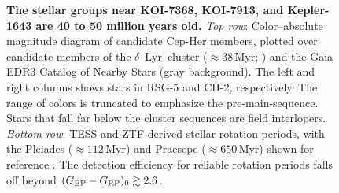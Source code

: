 \documentclass[12pt,twocolumn]{aastex63}
\newcommand{\bpmrpo}{(G_{\rm BP}-G_{\rm RP})_0}
\begin{document}
\begin{figure}[tp]
\begin{center}
		\vspace{-0.6cm}
	\end{center}
	\vspace{-0.7cm}
	\caption{
		{\bf The stellar groups near KOI-7368, KOI-7913, and Kepler-1643
    are 40 to 50 million years old.} 
    {\it Top row}: Color--absolute magnitude diagram of candidate
    Cep-Her members, plotted over candidate members of the
    $\delta$~Lyr~cluster ($\approx38$\,Myr;
    \citealt{bouma_kep1627_2022}) and the Gaia EDR3 Catalog of Nearby
    Stars (gray background).  The left and right columns shows stars
    in RSG-5 and CH-2, respectively.  The range of colors is truncated
    to emphasize the pre-main-sequence.  Stars that fall far below the
    cluster sequences are field interlopers.  {\it Bottom row}: TESS
    and ZTF-derived stellar rotation periods, with the Pleiades
    ($\approx 112$\,Myr) and Praesepe ($\approx 650$\,Myr) shown for
    reference \citep{rebull_rotation_2016a,douglas_poking_2017}.  The
    detection efficiency for reliable rotation periods falls off
    beyond $\bpmrpo \gtrsim 2.6$.
	\label{fig:age}
	}
\end{figure}
\end{document}
